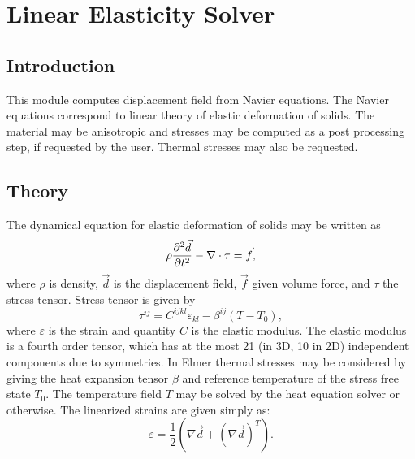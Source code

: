 \chapter{Linear Elasticity Solver}


\begin{versiona}

\section{Introduction}

This module computes displacement field from Navier equations. The Navier equations
correspond to linear theory of elastic deformation of solids. The material may
be anisotropic and stresses may be computed as a post processing step, if
requested by the user. Thermal stresses may also be requested.

\section{Theory}

The dynamical equation for elastic deformation of solids may be written as
\begin{equation}
\rho\frac{\partial^2 \Vec{d}}{\partial t^2} - \nabla\cdot {\bf \tau} = \Vec{f},
\end{equation}
where $\rho$ is density, $\Vec{d}$ is the displacement field, $\Vec{f}$ given volume force, and
$\tau$ the stress tensor.
Stress tensor is given by
\begin{equation}
\tau^{ij} = C^{ijkl}\varepsilon_{kl} - \beta^{ij}(T-T_0),
\end{equation}
where $\varepsilon$ is the strain and quantity $C$ is the elastic modulus.
The elastic modulus is a fourth order tensor, which has at the most 21 (in 3D,
10 in 2D) independent components due to symmetries.
In Elmer thermal stresses may be considered by giving
the heat expansion tensor $\beta$ and reference temperature of the stress
free state $T_0$. The temperature field
$T$ may be solved by the heat equation solver or otherwise.
The linearized strains are given simply as:
\begin{equation}
\varepsilon = \frac{1}{2}(\nabla{\Vec{d}} + (\nabla{\Vec{d}})^T).
\end{equation}


\end{versiona}
